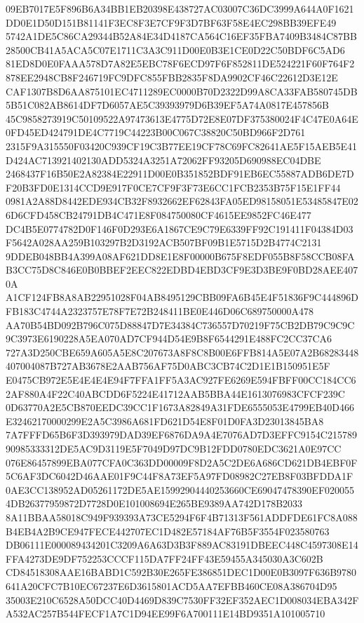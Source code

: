 \documentclass[UTF8,fontset=fandol,zihao=-4,a4paper]{ctexart}
\begin{document}
{{09EB7017E5F896B6A34BB1EB20398E438727AC03007C36DC3999A644A0F1621DD0E1D50D151B81141F3EC8F3E7CF9F3D7BF63F58E4EC298BB39EFE49
5742A1DE5C86CA29344B52A84E34D4187CA564C16EF35FBA7409B3484C87BB28500CB41A5ACA5C07E1711C3A3C911D00E0B3E1CE0D22C50BDF6C5AD6
81ED8D0E0FAAA578D7A82E5EBC78F6ECD97F6F852811DE524221F60F764F2878EE2948CB8F246719FC9DFC855FBB2835F8DA9902CF46C22612D3E12E
CAF1307B8D6AA875101EC4711289EC0000B70D2322D99A8CA33FAB580745DB5B51C082AB8614DF7D6057AE5C39393979D6B39EF5A74A0817E457856B
45C9858273919C50109522A97473613E4775D72E8E07DF375380024F4C47E0A64E0FD45ED424791DE4C7719C44223B00C067C38820C50BD966F2D761
2315F9A315550F03420C939CF19C3B77EE19CF78C69FC82641AE5F15AEB5E41D424AC713921402130ADD5324A3251A72062FF93205D690988EC04DBE
2468437F16B50E2A82384E22911D00E0B351852BDF91EB6EC55887ADB6DE7DF20B3FD0E1314CCD9E917F0CE7CF9F3F73E6CC1FCB2353B75F15E1FF44
0981A2A88D8442EDE934CB32F8932662EF62843FA05ED98158051E53485847E026D6CFD458CB24791DB4C471E8F084750080CF4615EE9852FC46E477
DC4B5E0774782D0F146F0D293E6A1867CE9C79E6339FF92C191411F04384D03F5642A028AA259B103297B2D3192ACB507BF09B1E5715D2B4774C2131
9DDEB048BB4A399A08AF621DD8E1E8F00000B675F8EDF055B8F58CCB08FAB3CC75D8C846E0B0BBEF2EEC822EDBD4EBD3CF9E3D3BE9F0BD28AEE4070A
A1CF124FB8A8AB22951028F04AB8495129CBB09FA6B45E4F51836F9C444896DFB183C4744A2323757E78F7E72B248411BE0E446D06C689750000A478
AA70B54BD092B796C075D88847D7E34384C736557D70219F75CB2DB79C9C9C9C3973E6190228A5EA070AD7CF944D54E9B8F6544291E488FC2CC37CA6
727A3D250CBE659A605A5E8C207673A8F8C8B00E6FFB814A5E07A2B68283448407004087B727AB3678E2AAB756AF75D0ABC3CB74C2D1E1B150951E5F
E0475CB972E5E4E4E4E94F7FFA1FF5A3AC927FE6269E594FBFF00CC184CC62AF880A4F22C40ABCDD6F5224E41712AAB5BBA44E1613076983CFCF239C
0D63770A2E5CB870EEDC39CC1F1673A82849A31FDE6555053E4799EB40D466E32462170000299E2A5C3986A681FD621D54E8F01D0FA3D23013845BA8
7A7FFFD65B6F3D393979DAD39EF6876DA9A4E7076AD7D3EFFC9154C21578990985333312DE5AC9D3119E5F7049D97DC9B12FDD0780EDC3621A0E97CC
076E86457899EBA077CFA0C363DD00009F8D2A5C2DE6A686CD621DB4EBF0F5C6AF3DC6042D46AAE01F9C44F8A73EF5A97FD08982C27EB8F03BFDDA1F
0AE3CC138952AD05261172DE5AE15992904440253660CE69047478390EF0200554DB26377959872D7728D0E101008694E265BE9389AA742D178B2033
8A11BBAA58018C949F939393A73CE5294F6F4B71313F561ADDFDE61FC8A088B4EB4A2B9CE947FECE442707EC1D482E57184AF76B5F3554F023580763
DB06111E000089434201C3209A6A63D3B3F889AC83191DBEEC448C4597308E14FFA4273DE9DF752253CCCF115DA7FF24FF43E59455A345030A3C602B
CD84518308AAE16BABD1C592B30E265FE386851DEC1D00E0B3097F636B9780641A20CFC7B10EC67237E6D3615801ACD5AA7EFBB460CE08A386704D95
35003E210C6528A50DCC40D4469D839C7530FF32EF352AEC1D008034EBA342FA532AC257B544FECF1A7C1D94EE99F6A700111E14BD9351A101005710
}}
\end{document}

